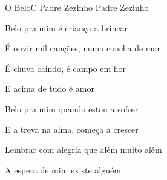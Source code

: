 \documentclass[a4,12pt,oneside]{book}
\newcommand{\RevDate}{\today}
\newcommand{\NotCCLIed}{\relax}
\begin{document}
\begin{song}{O Belo}{C}
  {Padre Zezinho}
  {Padre Zezinho}
  {}
  {\NotCCLIed}
  
	\renewcommand{\RevDate}{28 de abril de 2015}
 
	
	\ifChordBk	
		\vspace{-2em}\flushright{\Cchord \quad \Amchord \quad \Dmchord \quad \Gschord}
		\vspace{-1ex}
	\fi
	
	\begin{SBVerse*}
	   

	\vspace{-2ex}
	
	Belo pra mim é criança a brincar

	É ouvir mil canções, numa concha de mar

	É chuva caindo, é campo em flor

	E acima de tudo é amor
	\end{SBVerse*}

	\begin{SBVerse*}
	   \Ch{G7)}{}

	\vspace{-2ex}
	
	Belo pra mim quando estou a sofrer 

	E a treva na alma, começa a crescer

	Lembrar com alegria que além muito além

	A espera de mim existe alguém
	\end{SBVerse*}
\end{song}
\end{document}
